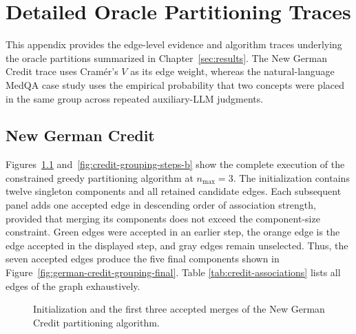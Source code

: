 \chapter{Detailed Oracle Partitioning Traces}
\label{app:oracle-partition-details}

This appendix provides the edge-level evidence and algorithm traces underlying the
oracle partitions summarized in Chapter~\ref{sec:results}. The New German Credit
trace uses Cram\'er's $V$ as its edge weight, whereas the natural-language MedQA
case study uses the empirical probability that two concepts were placed in the same
group across repeated auxiliary-LLM judgments.

\section{New German Credit}
\label{app:credit-partition-trace}

Figures~\ref{fig:credit-grouping-steps-a} and~\ref{fig:credit-grouping-steps-b}
show the complete execution of the constrained greedy partitioning algorithm at
$n_{\max}=3$. The initialization contains twelve singleton components and all
retained candidate edges. Each subsequent panel adds one accepted edge in descending
order of association strength, provided that merging its components does not exceed
the component-size constraint. Green edges were accepted in an earlier step, the
orange edge is the edge accepted in the displayed step, and gray edges remain
unselected. Thus, the seven accepted edges produce the five final components shown
in Figure~\ref{fig:german-credit-grouping-final}. Table \ref{tab:credit-associations} lists all edges of the graph exhaustively.



\begin{figure}[p]
  \centering
  \begin{minipage}[t]{0.49\textwidth}\centering
  \end{minipage}\hfill
  \begin{minipage}[t]{0.49\textwidth}\centering
  \end{minipage}

  \vspace{0.4em}
  \begin{minipage}[t]{0.49\textwidth}\centering
  \end{minipage}\hfill
  \begin{minipage}[t]{0.49\textwidth}\centering
  \end{minipage}
  \caption[New German Credit partitioning: initialization and first three merges]{Initialization and the first three accepted merges of the New German Credit partitioning algorithm.}
  \label{fig:credit-grouping-steps-a}
\end{figure}

